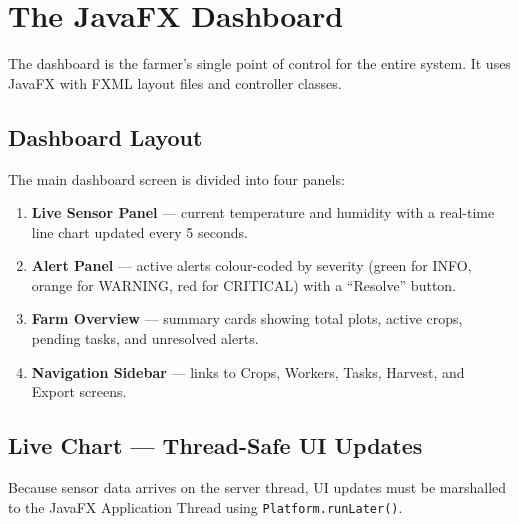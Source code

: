 \documentclass[12pt, a4paper]{report}
\begin{document}
\chapter{The JavaFX Dashboard}

The dashboard is the farmer's single point of control for the entire system. It uses JavaFX with FXML layout files and controller classes.

\section{Dashboard Layout}

The main dashboard screen is divided into four panels:

\begin{enumerate}[leftmargin=*, label=\textbf{\arabic*.}]
    \item \textbf{Live Sensor Panel} --- current temperature and humidity with a real-time line chart updated every 5 seconds.
    \item \textbf{Alert Panel} --- active alerts colour-coded by severity (green for INFO, orange for WARNING, red for CRITICAL) with a ``Resolve'' button.
    \item \textbf{Farm Overview} --- summary cards showing total plots, active crops, pending tasks, and unresolved alerts.
    \item \textbf{Navigation Sidebar} --- links to Crops, Workers, Tasks, Harvest, and Export screens.
\end{enumerate}

\section{Live Chart --- Thread-Safe UI Updates}

Because sensor data arrives on the server thread, UI updates must be marshalled to the JavaFX Application Thread using \texttt{Platform.runLater()}.
\end{document}
